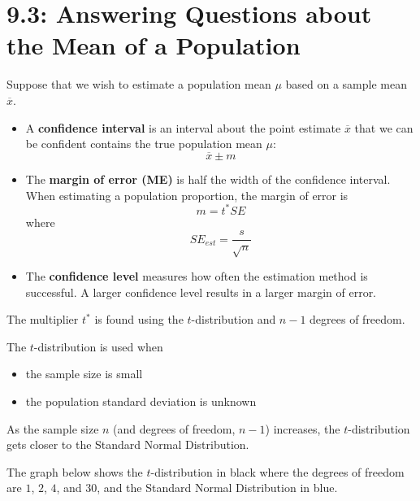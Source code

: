 \documentclass[../mathNotesPreamble]{subfiles}
\begin{document}
  \section{9.3: Answering Questions about the Mean of a Population}
    \begin{defn*}
      Suppose that we wish to estimate a population mean $\mu$ based on a sample mean $\overline{x}$.
      \begin{itemize}
        \item A \textbf{confidence interval} is an interval about the point estimate $\overline{x}$ that we can be confident contains the true population mean $\mu$:
          \[\overline{x}\pm m\]
        \item The \textbf{margin of error (ME)} is half the width of the confidence interval. When estimating a population proportion, the margin of error is
          \[m=t^* SE\]
          where
          \[SE_{est}=\frac{s}{\sqrt{n}}\]
        \item The \textbf{confidence level} measures how often the estimation method is successful. A larger confidence level results in a larger margin of error.
      \end{itemize}
    \end{defn*}
    \vspace*{2\baselineskip}

    The multiplier $t^*$ is found using the $t$-distribution and $n-1$ degrees of freedom.
    \pagebreak

    The $t$-distribution is used when
    \begin{itemize}
      \item the sample size is small %
      \item the population standard deviation is unknown
    \end{itemize}
    As the sample size $n$ (and degrees of freedom, $n-1$) increases, the $t$-distribution gets closer to the Standard Normal Distribution.

    The graph below shows the $t$-distribution in black where the degrees of freedom are $1$, $2$, $4$, and $30$, and the Standard Normal Distribution in blue.
\end{document}
